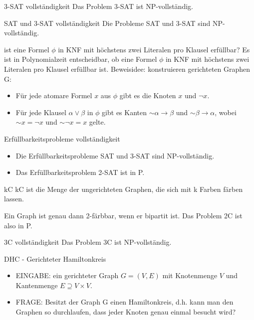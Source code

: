 \documentclass[avery5371]{flashcards}
\begin{document}
\begin{flashcard}[Satz]{3-SAT vollständigkeit}
Das Problem 3-SAT ist NP-vollständig.
\end{flashcard}

\begin{flashcard}[Satz]{SAT und 3-SAT vollständigkeit}
    Die Probleme SAT und 3-SAT sind NP-vollständig.
\end{flashcard}

\begin{flashcard}[Satz]{ist eine Formel $\phi$ in KNF mit höchstens zwei Literalen pro Klausel erfüllbar?}
    Es ist in Polynomialzeit entscheidbar, ob eine Formel $\phi$ in KNF mit höchstens zwei Literalen pro Klausel erfüllbar ist. 
Beweisidee: konstruieren gerichteten Graphen G:
\begin{itemize}
\item Für jede atomare Formel $x$ aus $\phi$ gibt es die Knoten $x$ und $\neg x$.
\item Für jede Klausel $\alpha\vee\beta$ in $\phi$ gibt es Kanten $\sim\alpha\rightarrow\beta$ und $\sim\beta\rightarrow\alpha$, wobei $\sim x =\neg x$ und $\sim\neg x=x$ gelte.
\end{itemize}
\end{flashcard}

\begin{flashcard}[Satz]{Erfüllbarkeitsprobleme vollständigkeit} 
\begin{itemize}
\item Die Erfüllbarkeitsprobleme SAT und 3-SAT sind NP-vollständig.
\item Das Erfüllbarkeitsproblem 2-SAT ist in P.
\end{itemize}
\end{flashcard}

\begin{flashcard}[Definition]{kC}
kC ist die Menge der ungerichteten Graphen, die sich mit k Farben färben lassen.

Ein Graph ist genau dann 2-färbbar, wenn er bipartit ist. Das Problem 2C ist also in P.
\end{flashcard}

\begin{flashcard}[Satz]{ 3C vollständigkeit}
    Das Problem 3C ist NP-vollständig.
\end{flashcard}

\begin{flashcard}{DHC - Gerichteter Hamiltonkreis}
\begin{itemize}
\item EINGABE: ein gerichteter Graph $G = (V , E )$ mit Knotenmenge $V$ und Kantenmenge $E\supseteq V\times V$.
\item FRAGE: Besitzt der Graph G einen Hamiltonkreis, d.h. kann man den Graphen so durchlaufen, dass jeder Knoten genau einmal besucht wird?
\end{itemize}
\end{flashcard}
\end{document}
